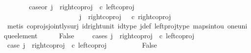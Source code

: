 \begin{isabellebody}
\ \ \ \ \isamarkupfalse%
\ \isamarkupfalse%
\ case{}{\isacharunderscore}{\kern0pt}or{\isacharunderscore}{\kern0pt}{}{\isacharcolon}{\kern0pt}\ {\isachardoublequoteopen}j\ {\isacharequal}{\kern0pt}\ right{\isacharunderscore}{\kern0pt}coproj\ {\isasymone}\ {\isacharparenleft}{\kern0pt}{\isasymone}{\isasymCoprod}{\isasymone}{\isacharparenright}{\kern0pt}{\isasymcirc}\isactrlsub c\ left{\isacharunderscore}{\kern0pt}coproj\ {\isasymone}\ {\isasymone}\ {\isasymor}\ \isanewline
\ \ \ \ \ \ \ \ \ \ \ \ \ \ \ \ \ \ \ \ \ \ j\ {\isacharequal}{\kern0pt}\ right{\isacharunderscore}{\kern0pt}coproj\ {\isasymone}\ {\isacharparenleft}{\kern0pt}{\isasymone}{\isasymCoprod}{\isasymone}{\isacharparenright}{\kern0pt}\ {\isasymcirc}\isactrlsub c\ right{\isacharunderscore}{\kern0pt}coproj\ {\isasymone}\ {\isasymone}{\isachardoublequoteclose}\isanewline
\ \ \ \ \ \ \isamarkupfalse%
\ {\isacharparenleft}{\kern0pt}metis\ coprojs{\isacharunderscore}{\kern0pt}jointly{\isacharunderscore}{\kern0pt}surj\ id{\isacharunderscore}{\kern0pt}right{\isacharunderscore}{\kern0pt}unit{}\ id{\isacharunderscore}{\kern0pt}type\ j{\isacharunderscore}{\kern0pt}def\ left{\isacharunderscore}{\kern0pt}proj{\isacharunderscore}{\kern0pt}type\ maps{\isacharunderscore}{\kern0pt}into{\isacharunderscore}{\kern0pt}{}u{}\ one{\isacharunderscore}{\kern0pt}unique{\isacharunderscore}{\kern0pt}element{\isacharparenright}{\kern0pt}\isanewline
\ \ \ \ \isamarkupfalse%
\ False\isanewline
\ \ \ \ \isamarkupfalse%
{\isacharparenleft}{\kern0pt}cases\ {\isachardoublequoteopen}j\ {\isacharequal}{\kern0pt}\ right{\isacharunderscore}{\kern0pt}coproj\ {\isasymone}\ {\isacharparenleft}{\kern0pt}{\isasymone}{\isasymCoprod}{\isasymone}{\isacharparenright}{\kern0pt}{\isasymcirc}\isactrlsub c\ left{\isacharunderscore}{\kern0pt}coproj\ {\isasymone}\ {\isasymone}{\isachardoublequoteclose}{\isacharparenright}{\kern0pt}\isanewline
\ \ \ \ \ \ \isamarkupfalse%
\ case{}{\isacharcolon}{\kern0pt}\ {\isachardoublequoteopen}j\ {\isacharequal}{\kern0pt}\ right{\isacharunderscore}{\kern0pt}coproj\ {\isasymone}\ {\isacharparenleft}{\kern0pt}{\isasymone}{\isasymCoprod}{\isasymone}{\isacharparenright}{\kern0pt}{\isasymcirc}\isactrlsub c\ left{\isacharunderscore}{\kern0pt}coproj\ {\isasymone}\ {\isasymone}{\isachardoublequoteclose}\isanewline
\ \ \ \ \ \ \isamarkupfalse%
\ False\isanewline
\ \ \ \ \ \ \isamarkupfalse%
\ {\isacharminus}{\kern0pt}\ \isanewline

\end{isabellebody}
